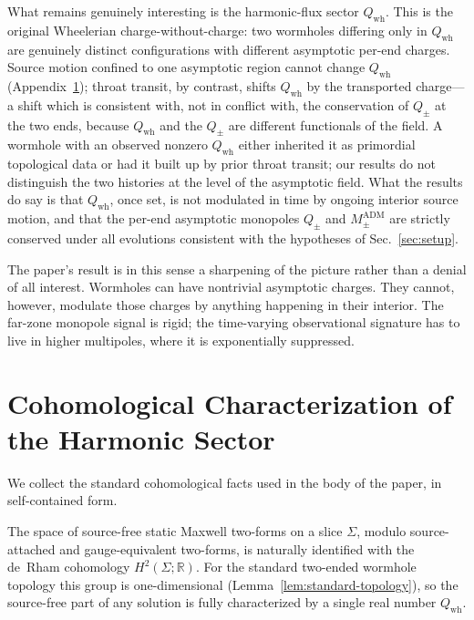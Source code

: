 \documentclass[aps,prd,onecolumn,nofootinbib,superscriptaddress]{revtex4-2}
\begin{document}
What remains genuinely interesting is the harmonic-flux sector $Q_{\mathrm{wh}}$. This is the original Wheelerian charge-without-charge: two wormholes differing only in $Q_{\mathrm{wh}}$ are genuinely distinct configurations with different asymptotic per-end charges. Source motion confined to one asymptotic region cannot change $Q_{\mathrm{wh}}$ (Appendix~\ref{app:cohomology}); throat transit, by contrast, shifts $Q_{\mathrm{wh}}$ by the transported charge---a shift which is consistent with, not in conflict with, the conservation of $Q_\pm$ at the two ends, because $Q_{\mathrm{wh}}$ and the $Q_\pm$ are different functionals of the field. A wormhole with an observed nonzero $Q_{\mathrm{wh}}$ either inherited it as primordial topological data or had it built up by prior throat transit; our results do not distinguish the two histories at the level of the asymptotic field. What the results do say is that $Q_{\mathrm{wh}}$, once set, is not modulated in time by ongoing interior source motion, and that the per-end asymptotic monopoles $Q_\pm$ and $M^{\mathrm{ADM}}_\pm$ are strictly conserved under all evolutions consistent with the hypotheses of Sec.~\ref{sec:setup}.

The paper's result is in this sense a sharpening of the picture rather than a denial of all interest. Wormholes can have nontrivial asymptotic charges. They cannot, however, modulate those charges by anything happening in their interior. The far-zone monopole signal is rigid; the time-varying observational signature has to live in higher multipoles, where it is exponentially suppressed.

\appendix

\section{Cohomological Characterization of the Harmonic Sector}
\label{app:cohomology}

We collect the standard cohomological facts used in the body of the paper, in self-contained form.

The space of source-free static Maxwell two-forms on a slice $\Sigma$, modulo source-attached and gauge-equivalent two-forms, is naturally identified with the de~Rham cohomology $H^2(\Sigma;\mathbb{R})$. For the standard two-ended wormhole topology this group is one-dimensional (Lemma~\ref{lem:standard-topology}), so the source-free part of any solution is fully characterized by a single real number $Q_{\mathrm{wh}}$.
\end{document}
